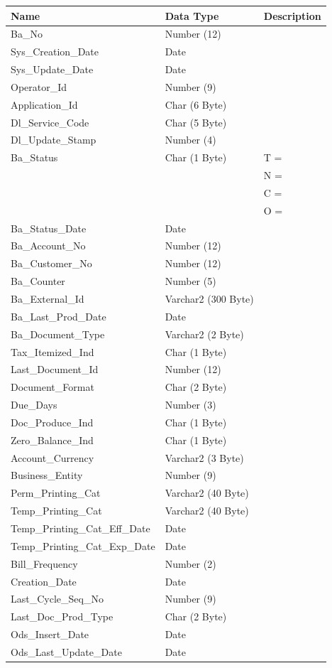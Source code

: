 \documentclass[12pt,twoside]{article}
\begin{document}
\footnotesize
\begin{center}
\begin{tabular}{lll}
\hline
\textbf{Name} & \textbf{Data Type} & \textbf{Description}\\
\hline
Ba\_No & Number (12) & \\
Sys\_Creation\_Date & Date & \\
Sys\_Update\_Date & Date & \\
Operator\_Id & Number (9) & \\
Application\_Id & Char (6 Byte) & \\
Dl\_Service\_Code & Char (5 Byte) & \\
Dl\_Update\_Stamp & Number (4) & \\
Ba\_Status & Char (1 Byte) & T =\\
 &  & N =\\
 &  & C =\\
 &  & O =\\
Ba\_Status\_Date & Date & \\
Ba\_Account\_No & Number (12) & \\
Ba\_Customer\_No & Number (12) & \\
Ba\_Counter & Number (5) & \\
Ba\_External\_Id & Varchar2 (300 Byte) & \\
Ba\_Last\_Prod\_Date & Date & \\
Ba\_Document\_Type & Varchar2 (2 Byte) & \\
Tax\_Itemized\_Ind & Char (1 Byte) & \\
Last\_Document\_Id & Number (12) & \\
Document\_Format & Char (2 Byte) & \\
Due\_Days & Number (3) & \\
Doc\_Produce\_Ind & Char (1 Byte) & \\
Zero\_Balance\_Ind & Char (1 Byte) & \\
Account\_Currency & Varchar2 (3 Byte) & \\
Business\_Entity & Number (9) & \\
Perm\_Printing\_Cat & Varchar2 (40 Byte) & \\
Temp\_Printing\_Cat & Varchar2 (40 Byte) & \\
Temp\_Printing\_Cat\_Eff\_Date & Date & \\
Temp\_Printing\_Cat\_Exp\_Date & Date & \\
Bill\_Frequency & Number (2) & \\
Creation\_Date & Date & \\
Last\_Cycle\_Seq\_No & Number (9) & \\
Last\_Doc\_Prod\_Type & Char (2 Byte) & \\
Ods\_Insert\_Date & Date & \\
Ods\_Last\_Update\_Date & Date & \\
\hline
\end{tabular}
\end{center}
\end{document}
